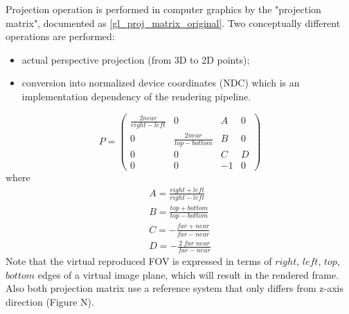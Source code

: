 Projection operation is performed in computer graphics by the "projection matrix", documented as \ref{gl_proj_matrix_original}. Two conceptually different operations are performed:
\begin{itemize}
\item actual perspective projection (from 3D to 2D points);
\item conversion into normalized device coordinates (NDC) which is an implementation dependency of the rendering pipeline.
\end{itemize}
\begin{equation}
P = \left( \begin{array}{cccc} \frac{2 near}{right - left} & 0 & A & 0 \\ 0 & \frac{2 near}{top - bottom} & B & 0 \\ 0 & 0 & C & D \\ 0 & 0 & -1 & 0 \end{array} \right)
\label{gl_proj_matrix_original}
\end{equation}
where
\begin{equation}
\begin{array}{c}
A = \frac{right + left}{right - left} \\[0.6em]
B = \frac{top + bottom}{top - bottom} \\[0.6em]
C = -\frac{far + near}{far - near}  \\[0.6em]
D = -\frac{2 \; far \; near}{far - near}
\label{gl_proj_matrix_original_details}
\end{array}
\end{equation}
Note that the virtual reproduced FOV is expressed in terms of $right$, $left$, $top$, $bottom$ edges of a virtual image plane, which will result in the rendered frame. Also both projection matrix use a reference system that only differs from z-axis direction (Figure N).

